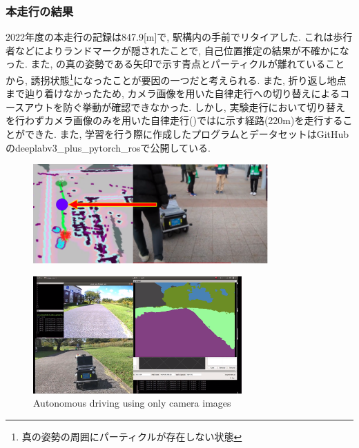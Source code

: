 \documentclass[uplatex, twocolumn, 9pt]{jsproceedings}
\begin{document}
\newpage
\subsubsection{本走行の結果}
2022年度の本走行の記録は847.9[m]で, 駅構内の手前でリタイアした. これは歩行者などによりランドマークが隠されたことで, 自己位置推定の結果が不確かになった. また, の真の姿勢である矢印で示す青点とパーティクルが離れていることから, 誘拐状態\footnote[3]{真の姿勢の周囲にパーティクルが存在しない状態}\cite{emcl-thesis}になったことが要因の一つだと考えられる. また, 折り返し地点まで辿り着けなかったため, カメラ画像を用いた自律走行への切り替えによるコースアウトを防ぐ挙動が確認できなかった. しかし, 実験走行において切り替えを行わずカメラ画像のみを用いた自律走行()ではに示す経路(220m)を走行することができた. また, 学習を行う際に作成したプログラムとデータセットはGitHubのdeeplabv3\_plus\_pytorch\_ros\cite{DeeplabV3}で公開している.

\begin{figure}[h]
  \centering

  \includegraphics[width=90mm]{fig/kidnapped5.pdf}
  \caption{}
  \label{fig:kidnapped}%
\end{figure}


\begin{figure}[h]
  \centering
  \includegraphics[width=80mm]{fig/seg-only.pdf}
  \caption{Autonomous driving using only camera images}
  \label{fig:seg-only}%
\end{figure}
\end{document}
